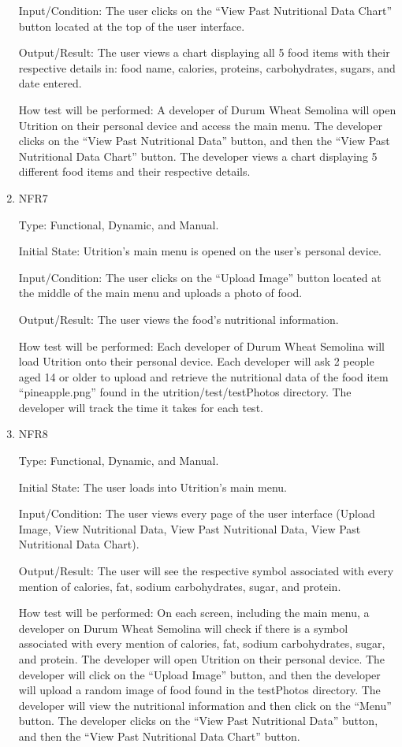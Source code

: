 \documentclass[12pt, titlepage]{article}
\begin{document}
\begin{enumerate}
Input/Condition: The user clicks on the “View Past Nutritional Data Chart” button located at the top of the user interface.

Output/Result: The user views a chart displaying all 5 food items with their respective details in: food name, calories, proteins, carbohydrates, sugars, and date entered.

How test will be performed: A developer of Durum Wheat Semolina will open Utrition on their personal device and access the main menu. The developer clicks on the “View Past Nutritional Data” button, and then the “View Past Nutritional Data Chart” button. The developer views a chart displaying 5 different food items and their respective details.

\item{NFR7\\}

Type: Functional, Dynamic, and Manual.

Initial State: Utrition’s main menu is opened on the user’s personal device.

Input/Condition: The user clicks on the “Upload Image” button located at the middle of the main menu and uploads a photo of food.

Output/Result: The user views the food’s nutritional information.

How test will be performed: Each developer of Durum Wheat Semolina will load Utrition onto their personal device. Each developer will ask 2 people aged 14 or older to upload and retrieve the nutritional data of the food item “pineapple.png” found in the utrition/test/testPhotos directory. The developer will track the time it takes for each test.

\item{NFR8\\}

Type: Functional, Dynamic, and Manual.

Initial State: The user loads into Utrition’s main menu.

Input/Condition: The user views every page of the user interface (Upload Image, View Nutritional Data, View Past Nutritional Data, View Past Nutritional Data Chart).

Output/Result: The user will see the respective symbol associated with every mention of calories, fat, sodium carbohydrates, sugar, and protein.

How test will be performed: On each screen, including the main menu, a developer on Durum Wheat Semolina will check if there is a symbol associated with every mention of calories, fat, sodium carbohydrates, sugar, and protein. The developer will open Utrition on their personal device. The developer will click on the “Upload Image” button, and then the developer will upload a random image of food found in the testPhotos directory. The developer will view the nutritional information and then click on the “Menu” button. The developer clicks on the “View Past Nutritional Data” button, and then the “View Past Nutritional Data Chart” button.


\end{enumerate}
\end{document}
